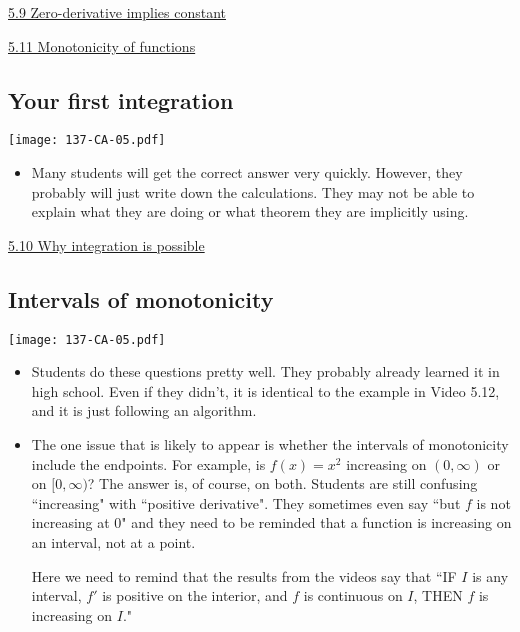 \documentclass[11pt]{article}
\newcommand {\DS} [1] {${\displaystyle #1}$}
\newcommand{\nl}{\hfill \vspace{-1.1\baselineskip}} %
\newcommand{\vix}{\hspace{8mm} \href{https://www.youtube.com/watch?v=l10mJLuG-U4&list=PLlwePzQY_wW9m5oabUf6hvfVfAaA9uAwM&index=9}{5.9 Zero-derivative implies constant}}
\newcommand{\vx}{\hspace{8mm} \href{https://www.youtube.com/watch?v=15-oyDZT2aE&list=PLlwePzQY_wW9m5oabUf6hvfVfAaA9uAwM&index=10}{5.10 Why integration is possible}}
\newcommand{\vxi}{\hspace{8mm} \href{https://www.youtube.com/watch?v=HlzVrFcqi04&list=PLlwePzQY_wW9m5oabUf6hvfVfAaA9uAwM&index=11}{5.11 Monotonicity of functions}}
\begin{document}
\begin{videos}
\vix

\vxi
\end{videos}

\newpage
\subsection{Your first integration}

\begin{center}
{ \texttt{[image: 137-CA-05.pdf]}} 
\end{center}


\begin{comments}
\nl
\begin{itemize}
\item  Many students will get the correct answer very quickly.  However, they probably will just write down the calculations.  They may not be able to explain what they are doing or what theorem they are implicitly using.
\end{itemize}	
\end{comments}

\begin{videos}
\vx
\end{videos}

\newpage
\subsection{Intervals of monotonicity}

\begin{center}
{ \texttt{[image: 137-CA-05.pdf]}} 
\end{center}


\begin{comments}
\nl
\begin{itemize}
\item   Students do these questions pretty well.  They probably already learned it in high school.  Even if they didn't, it is identical to the example in Video 5.12, and it is just following an algorithm.
\item The one issue that is likely to appear is whether the intervals of monotonicity include the endpoints.  For example, is \DS{f(x)=x^2} increasing on $(0, \infty)$ or on $[0, \infty)$?  The answer is, of course, on both.    Students are still confusing ``increasing" with ``positive derivative".   They sometimes even say ``but $f$ is not increasing at $0$" and they need to be reminded that a function is increasing on an interval, not at a point.

Here we need to remind that the results from the videos say that ``IF $I$ is any interval, $f'$ is positive on the interior, and $f$ is continuous on $I$, THEN $f$ is increasing on $I$."
\end{itemize}	
\end{comments}
\end{document}
